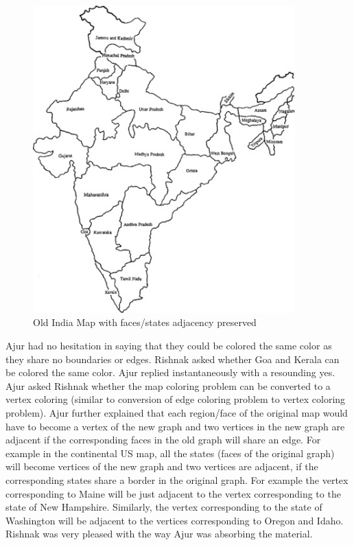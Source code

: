 \begin{figure}
\begin{center}
\includegraphics[width=0.9\textwidth]{MapIndia.jpg}
\end{center}
\caption{Old India Map with faces/states adjacency preserved}\label{10g10}
\end{figure}

Ajur had no hesitation in saying that they could be colored the same color as they share no boundaries or edges. Rishnak asked whether Goa and Kerala can be colored the same color. Ajur replied instantaneously with a resounding yes. Ajur asked Rishnak whether the map coloring problem can be converted to a vertex coloring (similar to conversion of edge coloring problem to vertex coloring problem). Ajur further explained that each region/face of the original map would have to become a vertex of the new graph and two vertices in the new graph are adjacent if the corresponding faces in the old graph will share an edge. For example in the continental US map, all the states (faces of the original graph) will become vertices of the new graph and two vertices are adjacent, if the corresponding states share a border in the original graph. For example the vertex corresponding to Maine will be just adjacent to the vertex corresponding to the state of New Hampshire. Similarly, the vertex corresponding to the state of Washington will be adjacent to the vertices corresponding to Oregon and Idaho. Rishnak was very pleased with the way Ajur was absorbing the material. 

